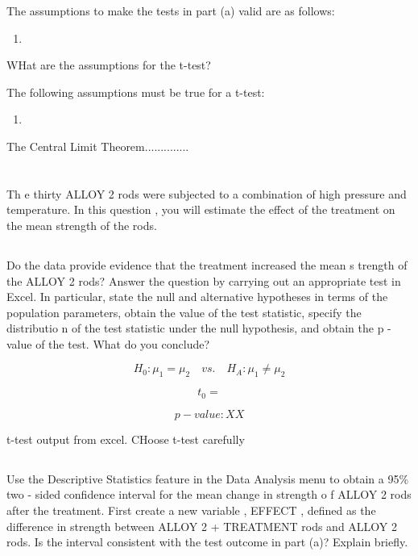 \documentclass[letterpaper]{article}
\begin{document}
The assumptions to make the tests in part (a) valid are as follows:

\begin{enumerate}
 \item
\end{enumerate}

WHat are the assumptions for the t-test?

The following assumptions must be true for a t-test:
\begin{enumerate}
 \item
\end{enumerate}
The Central Limit Theorem..............

\section{}%
Th e  thirty  ALLOY  2  rods  were  subjected  to  a  combination  of  high
pressure  and  temperature.  In  this  question , you will estimate the effect
of the treatment on the mean strength of the rods.

\subsection{}%
Do the data provide evidence that the treatment increased the mean s trength of
the ALLOY 2  rods? Answer the question by carrying out an appropriate test in
Excel.  In particular, state  the null  and alternative hypotheses in terms of
the population parameters, obtain the value of the test  statistic,  specify the
distributio n of the test statistic under the null hypothesis, and obtain the  p
- value of the test.  What do you conclude?

$$H_0: \mu_1 = \mu_2  \quad vs. \quad H_A: \mu_1 \neq \mu_2  $$

$$t_0 =$$

$$ {p-value}: XX $$

t-test output from excel. CHoose t-test carefully

\subsection{}%
Use the  Descriptive Statistics feature in  the  Data Analysis menu to obtain a
95\%  two - sided  confidence interval for the mean change in strength o f ALLOY
2 rods after the treatment.   First create a new variable , EFFECT , defined as
the difference in strength between ALLOY 2 + TREATMENT rods and ALLOY 2 rods. Is
the interval consistent with the  test  outcome in part  (a)? Explain briefly.
\end{document}
